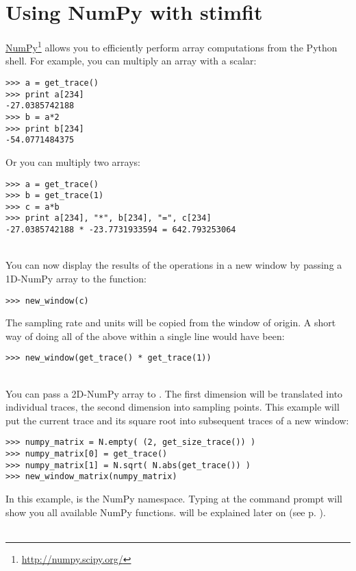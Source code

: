 \section{Using NumPy with stimfit}
\href{http://numpy.scipy.org/}{NumPy}\footnote{\url{http://numpy.scipy.org/}} allows you to efficiently perform array computations from the Python shell. For example, you can multiply an array with a scalar:
\begin{lstlisting}
>>> a = get_trace()
>>> print a[234]
-27.0385742188
>>> b = a*2
>>> print b[234]
-54.0771484375
\end{lstlisting}
Or you can multiply two arrays:
\begin{lstlisting}
>>> a = get_trace()
>>> b = get_trace(1)
>>> c = a*b
>>> print a[234], "*", b[234], "=", c[234]
-27.0385742188 * -23.7731933594 = 642.793253064
\end{lstlisting}
\\
You can now display the results of the operations in a new window by passing a 1D-NumPy array to the  function:
\begin{lstlisting}
>>> new_window(c)
\end{lstlisting}
The sampling rate and units will be copied from the window of origin. A short way of doing all of the above within a single line would have been:
\begin{lstlisting}
>>> new_window(get_trace() * get_trace(1))
\end{lstlisting}
\\
You can pass a 2D-NumPy array to . The first dimension will be translated into individual traces, the second dimension into sampling points. This example will put the current trace and its square root into subsequent traces of a new window:
\begin{lstlisting}
>>> numpy_matrix = N.empty( (2, get_size_trace()) )
>>> numpy_matrix[0] = get_trace()
>>> numpy_matrix[1] = N.sqrt( N.abs(get_trace()) )
>>> new_window_matrix(numpy_matrix) 
\end{lstlisting}
In this example,  is the NumPy namespace. Typing  at the command prompt
will show you all available NumPy functions.  will be explained later on (see p. \pageref{getsizetrace}). \smallskip \\
\\
